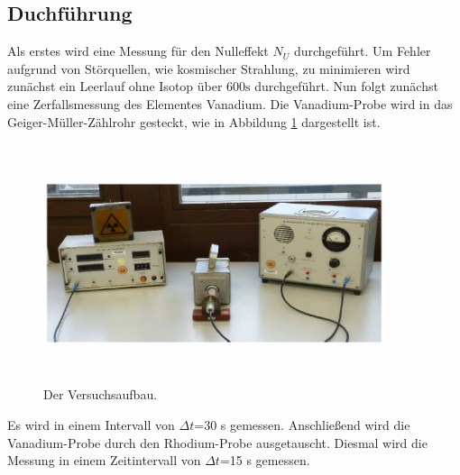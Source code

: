 \subsection{Duchführung}
Als erstes wird eine Messung für den Nulleffekt $N_U$ durchgeführt.
Um Fehler aufgrund von Störquellen, wie kosmischer Strahlung, zu minimieren wird zunächst ein Leerlauf 
ohne Isotop über $\text{600}\text{s}$ durchgeführt. 
Nun folgt zunächst eine Zerfallsmessung des Elementes Vanadium. Die Vanadium-Probe wird in das Geiger-Müller-Zählrohr gesteckt, 
wie in Abbildung \ref{fig:Aufbau1} dargestellt ist.
\begin{figure}[H]
    \centering
    \includegraphics[width = 10cm, height= 7cm]{Aufbau.png}
    \caption{Der Versuchsaufbau. \cite{1}}
    \label{fig:Aufbau1}
\end{figure}
\noindent
Es wird in einem Intervall von $\Delta t$=30 s gemessen.
Anschließend wird die Vanadium-Probe durch den Rhodium-Probe ausgetauscht. Diesmal wird 
die Messung in einem Zeitintervall von $\Delta t$=15 s gemessen.

\label{sec:Aufbau und Durchführung}

